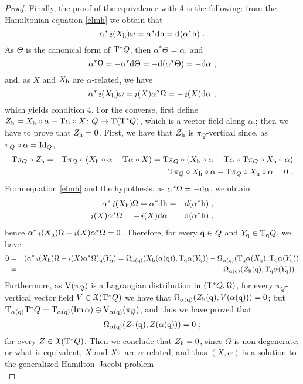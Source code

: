 \documentclass[12pt]{report}
\def\beq{\begin{equation}}
\def\eeq{\end{equation}}
\def\beann{\begin{eqnarray*}}
\def\eeann{\end{eqnarray*}}
\def\qed{\ifvmode\removelastskip\fi
{\unskip\nobreak\hfil\penalty50\hbox{}\nobreak\hfil
\hbox{\vrule height1.2ex width1.2ex}\parfillskip=0pt
\finalhyphendemerits=0 \par\smallskip}}
\def\vf{\mathfrak X}
\def\d{{\rm d}}
\def\Tan{{\rm T}}
\def\inn{\mathop{i}\nolimits}
\begin{document}
\begin{proof}
Finally, the proof of the equivalence with 4 is the following:
from the Hamiltonian equation \eqref{elmh} we obtain that
$$
\alpha^*\inn(X_{\rm h})\omega=\alpha^*\d{\rm h}=\d(\alpha^*{\rm h}) \ .
$$
As $\Theta$ is the canonical form of $\Tan^*Q$, then
$\alpha^*\Theta=\alpha$, and
\beq
\alpha^*\Omega = -\alpha^*\d\Theta=-\d(\alpha^*\Theta)=-\d\alpha \ ,
\label{00}
\eeq
and, as $X$ and $X_{\rm h}$ are $\alpha$-related, we have
$$
\alpha^*\inn(X_{\rm h})\omega=\inn(X)\alpha^*\Omega=-\inn(X)\d\alpha
\ ,
$$
which yields condition 4. 
For the converse, first define
$Z_{\rm h}=X_{\rm h}\circ\alpha-\Tan\alpha\circ X\colon Q\to \Tan(\Tan^*Q)$,
which is a vector field along $\alpha$.;
then we have to prove that $Z_{\rm h}=0$.
First, we have that $Z_{\rm h}$ is $\pi_Q$-vertical since,
as $\pi_Q\circ\alpha={\rm Id}_Q$,
\beann
\Tan\pi_Q\circ Z_{\rm h} &=& \Tan\pi_Q\circ(X_{\rm h}\circ\alpha-\Tan\alpha\circ X)=
\Tan\pi_Q\circ(X_{\rm h}\circ\alpha-\Tan\alpha\circ\Tan\pi_Q\circ X_{\rm h}\circ\alpha)
\\ &=&
\Tan\pi_Q\circ X_{\rm h}\circ\alpha-\Tan\pi_Q\circ X_{\rm h}\circ\alpha=0 \ .
\eeann
From equation \eqref{elmh}
and the hypothesis, as $\alpha^*\Omega=-\d\alpha$, we obtain
\beann
\alpha^*\inn(X_{\rm h})\Omega = \alpha^*\d{\rm h} &=& d(\alpha^*{\rm h})
\ ,
\\
\inn(X)\alpha^*\Omega=-\inn(X)\d\alpha &=& \d(\alpha^*{\rm h}) \ ,
\eeann
hence $\alpha^*\inn(X_{\rm h})\Omega-\inn(X)\alpha^*\Omega=0$.
Therefore, for every ${\rm q}\in Q$ and $Y_{\rm q}\in\Tan_{\rm q}Q$, we have
\beann
0 &=& (\alpha^*\inn(X_{\rm h})\Omega-\inn(X)\alpha^*\Omega)_{\rm q}(Y_{\rm q})=
\Omega_{\alpha({\rm q})}(X_{\rm h}(\alpha({\rm q})),\Tan_{\rm q}\alpha(Y_{\rm q}))-
\Omega_{\alpha({\rm q})}(\Tan_{\rm q}\alpha(X_{\rm q}),\Tan_{\rm q}\alpha(Y_{\rm q}))
\\
&=& \Omega_{\alpha({\rm q})}(Z_{\rm h}({\rm q}),\Tan_{\rm q}\alpha(Y_{\rm q})) \ .
\eeann
Furthermore, as ${\rm V}(\pi_Q)$ is a Lagrangian distribution in 
$(\Tan^*Q,\Omega)$, for every $\pi_Q$-vertical vector field $V\in\vf(\Tan^*Q)$ 
we have that
$\Omega_{\alpha({\rm q})}(Z_{\rm h}({\rm q}),V(\alpha({\rm q})))=0$;
but $\Tan_{\alpha({\rm q})}\Tan^*Q=
\Tan_{\alpha({\rm q})}({\rm Im}\,\alpha)\oplus{\rm V}_{\alpha({\rm q})}(\pi_Q)$,
and thus we have proved that
$$
\Omega_{\alpha({\rm q})}(Z_{\rm h}({\rm q}),Z(\alpha({\rm q})))=0 \ ;
$$
for every $Z\in\vf(\Tan^*Q)$. Then we conclude that $Z_{\rm h}=0$,
since $\Omega$ is non-degenerate;
or what is equivalent,
$X$ and $X_{\rm h}$ are $\alpha$-related, and thus
$(X,\alpha)$ is a solution to the generalized Hamilton--Jacobi problem
\\ \qed \end{proof}
\end{document}
